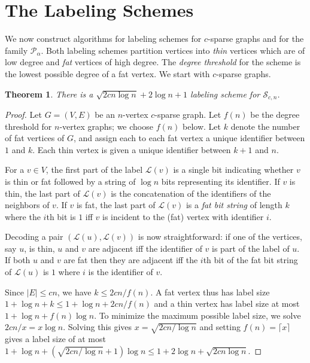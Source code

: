 \documentclass{article}
\newtheorem{theorem}{Theorem}
\theoremstyle{remark}
\newcommand{\la}{\ensuremath{ \mathcal{L}}}
\newcommand{\PLB}{\ensuremath{ \mathcal{P}_{\alpha}}}
\newcommand{\Sparse}{\ensuremath{ \mathcal{S}_{c,n}}}
\begin{document}
\section{The Labeling Schemes}
\label{sec:lab_schem}
We now construct algorithms for labeling schemes for $c$-sparse graphs and for the family $\PLB$. Both labeling schemes partition vertices into \emph{thin} vertices which are of low degree and \emph{fat} vertices of high degree. The \emph{degree threshold} for the scheme is the lowest possible degree of a fat vertex. We start with $c$-sparse graphs.
\begin{theorem}\label{sparse-label}
There is a $\sqrt{2cn\log n} + 2\log n + 1$ labeling scheme for $\Sparse$.
\end{theorem}
\begin{proof}
Let $G=(V,E)$ be an $n$-vertex $c$-sparse graph. Let $f(n)$ be the degree threshold for $n$-vertex graphs; we choose $f(n)$ below. Let $k$ denote the number of fat vertices of $G$, and assign each to each fat vertex a unique identifier between $1$ and $k$. Each thin vertex is given a unique identifier between $k+1$ and $n$.

For a $v\in V$, the first part of the label $\la(v)$ is a single bit indicating whether $v$ is thin or fat followed by a string of $\log n$ bits representing its identifier. If $v$ is thin, the last part of $\la(v)$ is the concatenation of the identifiers of the neighbors of $v$. If $v$ is fat, the last part of $\la(v)$ is a \emph{fat bit string} of length $k$ where the $i$th bit is $1$ iff $v$ is incident to the (fat) vertex with identifier $i$.

Decoding a pair $(\la(u),\la(v))$ is now straightforward: if one of the vertices, say $u$, is thin, $u$ and $v$ are adjacent iff the identifier of $v$ is part of the label of $u$. If both $u$ and $v$ are fat then they are adjacent iff the $i$th bit of the fat bit string of $\la(u)$ is $1$ where $i$ is the identifier of $v$.

Since $|E|\leq cn$, we have $k\leq 2cn/f(n)$. A fat vertex thus has label size $1 + \log n + k\leq 1 + \log n + 2cn/f(n)$ and a thin vertex has label size at most $1 + \log n + f(n)\log n$. To minimize the maximum possible label size, we solve $2cn/x = x\log n$. Solving this gives $x = \sqrt{2cn/\log n}$ and setting $f(n) = \lceil x\rceil$ gives a label size of at most $1 + \log n + (\sqrt{2cn/\log n} + 1)\log n\leq 1 + 2\log n + \sqrt{2cn\log n}$.
\end{proof}
\end{document}
